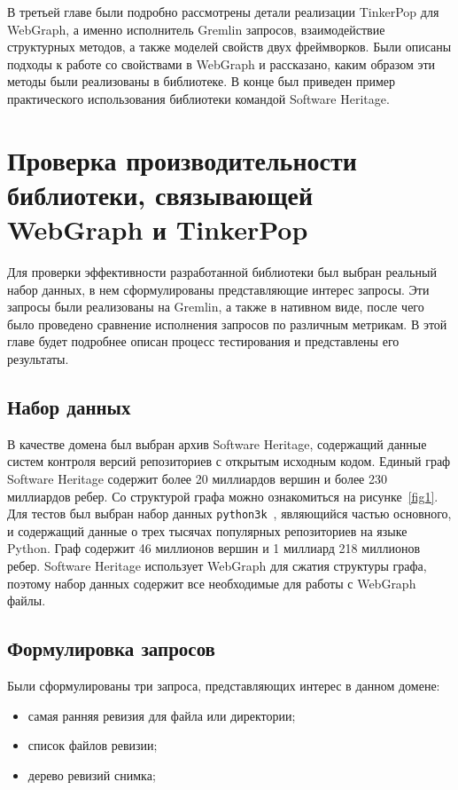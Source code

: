 \documentclass[times,specification,annotation]{itmo-student-thesis}
\begin{document}
\chapterconclusion

В третьей главе были подробно рассмотрены детали реализации TinkerPop для WebGraph, а именно исполнитель Gremlin запросов, взаимодействие структурных методов, а также моделей свойств двух фреймворков. Были описаны подходы к работе со свойствами в WebGraph и рассказано, каким образом эти методы были реализованы в библиотеке. В конце был приведен пример практического использования библиотеки командой Software Heritage.

\chapter{Проверка производительности библиотеки, связывающей WebGraph и TinkerPop}

Для проверки эффективности разработанной библиотеки был выбран реальный набор данных, в нем сформулированы представляющие интерес запросы. Эти запросы были реализованы на Gremlin, а также в нативном виде, после чего было проведено сравнение исполнения запросов по различным метрикам. В этой главе будет подробнее описан процесс тестирования и представлены его результаты.

\section{Набор данных}

В качестве домена был выбран архив Software Heritage, содержащий данные систем контроля версий репозиториев с открытым исходным кодом. Единый граф Software Heritage содержит более 20 миллиардов вершин и более 230 миллиардов ребер. Со структурой графа можно ознакомиться на рисунке~\ref{fig1}. Для тестов был выбран набор данных \texttt{python3k}~\cite{swh-dataset}, являющийся частью основного, и содержащий данные о трех тысячах популярных репозиториев на языке Python. Граф содержит 46 миллионов вершин и 1 миллиард 218 миллионов ребер. Software Heritage использует WebGraph для сжатия структуры графа, поэтому набор данных содержит все необходимые для работы с WebGraph файлы.

\section{Формулировка запросов}

Были сформулированы три запроса, представляющих интерес в данном домене:

\begin{itemize}
    \item самая ранняя ревизия для файла или директории;
    \item список файлов ревизии;
    \item дерево ревизий снимка;
\end{itemize}
\end{document}
